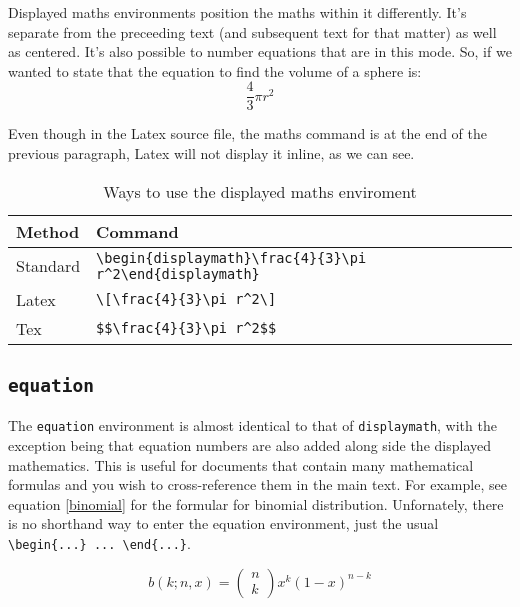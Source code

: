 \documentclass[a4paper]{article}
\begin{document}
Displayed maths environments position the maths within it differently.
It's separate from the preceeding text (and subsequent text for that
matter) as well as centered. It's also possible to number equations that
are in this mode. So, if we wanted to state that the equation to find
the volume of a sphere is: \[\frac{4}{3}\pi r^2\]

Even though in the Latex source file, the maths command is at the end of
the previous paragraph, Latex will not display it inline, as we can see.

\begin{table}[!htp]
\begin{tabular}{|l|l|l|}
\hline
  Method & Command \\ \hline
  Standard & \verb|\begin{displaymath}\frac{4}{3}\pi r^2\end{displaymath}| \\ \hline
  Latex & \verb|\[\frac{4}{3}\pi r^2\]| \\ \hline
  Tex & \verb|$$\frac{4}{3}\pi r^2$$| \\ \hline
\end{tabular}
\caption{Ways to use the displayed maths enviroment}
\end{table}

\subsection{\texttt{equation}}

The \texttt{equation} environment is almost identical to that of
\texttt{displaymath}, with the exception being that equation numbers are
also added along side the displayed mathematics. This is useful for
documents that contain many mathematical formulas and you wish to
cross-reference them in the main text. For example, see equation \ref{binomial} for
the formular for binomial distribution. Unfornately, there is no
shorthand way to enter the equation environment, just the usual
\verb|\begin{...} ... \end{...}|.

\begin{equation}
b\left(k; n, x\right) = \left( \begin{array}{c} n \\ k \end{array}\right) x^k\left(1-x\right)^{n-k}
\label{binomial}
\end{equation}
\end{document}
